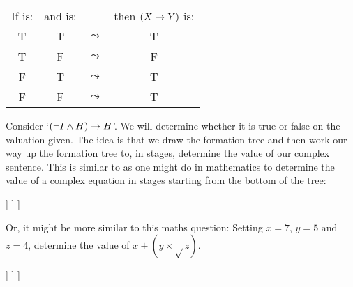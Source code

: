 {\begin{enumerate}
\begin{center}
			\begin{tabular}{cccc}
				If \metaX is:&and \metaY is:&&then $(X\rightarrow Y)$ is:\\
				T & T &$\leadsto$& T\\
				T & F &$\leadsto$& F\\
				F & T &$\leadsto$& T\\
				F & F &$\leadsto$& T
			\end{tabular}
		\end{center}
	\end{enumerate}
}

Consider 
`$(\neg I\mathbin{\wedge} H)\rightarrow H$'. We will determine whether it is true or false on the valuation given. 
The idea is that we draw the formation tree and then work our way up the formation tree to, in stages, determine the value of our complex sentence.
This is similar to as one might do in mathematics to determine the value of a complex equation in stages starting from the bottom of the tree:
\begin{center}
	\begin{forest}
		[{$7\mainconnective{+}(5\times\sqrt{}4)$}, label=right:{\scriptsize $=17$}
		[{$7$}]
		[{$(5\mainconnective{\times} \sqrt{}4)$}, label=right:{\scriptsize $=10$}
		[{$5$}]
		[{$\mainconnective{\sqrt{}}{4}$}, label=right:{\scriptsize $=2$}
		[{$4$}]
		]
		]
		]
	\end{forest}
\end{center}

Or, it might be more similar to this maths question: Setting $x=7$, $y=5$ and $z=4$,  determine the value of $x+(y\times\sqrt{}z)$. 
\begin{center}
	\begin{forest}
		[{$x+(y\times\sqrt{}z)$}, label=right:{\scriptsize $=17$}
		[$x$, label=left:{\scriptsize $7=$}]
		[{$y\times\sqrt{}z$}, label=right:{\scriptsize $=10$}
		[$y$, label=left:{\scriptsize $5=$}]
		[{$\sqrt{}z$}, label=right:{\scriptsize $=2$}
		[$z$, label=right:{\scriptsize $=4$}]
		]
		]
		]
	\end{forest}
\end{center}

